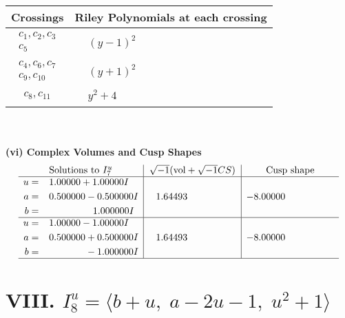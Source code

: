 \documentclass[1p]{elsarticle_modified}
\theoremstyle{definition}
\newcommand{\I}{\sqrt{-1}}
\begin{document}
\begin{tabular}{m{50pt}|m{274pt}}
Crossings & \hspace{64pt}Riley Polynomials at each crossing \\
\hline $$\begin{aligned}c_{1},c_{2},c_{3}\\c_{5}\end{aligned}$$&$\begin{aligned}
&(y-1)^2
\end{aligned}$\\
\hline $$\begin{aligned}c_{4},c_{6},c_{7}\\c_{9},c_{10}\end{aligned}$$&$\begin{aligned}
&(y+1)^2
\end{aligned}$\\
\hline $$\begin{aligned}c_{8},c_{11}\end{aligned}$$&$\begin{aligned}
&y^2+4
\end{aligned}$\\
\hline
\end{tabular}\\~\\
\newpage\flushleft \textbf{(vi) Complex Volumes and Cusp Shapes}
$$\begin{array}{c|c|c}  
\text{Solutions to }I^u_{7}& \I (\text{vol} + \sqrt{-1}CS) & \text{Cusp shape}\\
 \hline 
\begin{aligned}
u &= \phantom{-}1.00000 + 1.00000 I \\
a &= \phantom{-}0.500000 - 0.500000 I \\
b &= \phantom{-0.000000 -}1.000000 I\end{aligned}
 & \phantom{-}1.64493\phantom{ +0.000000I} & -8.00000\phantom{ +0.000000I} \\ \hline\begin{aligned}
u &= \phantom{-}1.00000 - 1.00000 I \\
a &= \phantom{-}0.500000 + 0.500000 I \\
b &= \phantom{-0.000000 } -1.000000 I\end{aligned}
 & \phantom{-}1.64493\phantom{ +0.000000I} & -8.00000\phantom{ +0.000000I}\\
 \hline 
 \end{array}$$\newpage\newpage\renewcommand{\arraystretch}{1}
\centering \section*{VIII. $I^u_{8}= \langle b+u,\;a-2 u-1,\;u^2+1 \rangle$}
\end{document}
